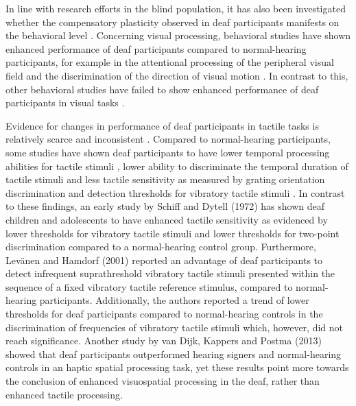 \documentclass[12pt]{article}
\begin{document}
\par In line with research efforts in the blind population, it has also been investigated whether the compensatory plasticity observed in deaf participants manifests on the behavioral level \parencite{heimler_response_2014,heimler_revisiting_2014}. Concerning visual processing, behavioral studies have shown enhanced performance of deaf participants compared to normal-hearing participants, for example in the attentional processing of the peripheral visual field \parencite{proksch_changes_2002} and the discrimination of the direction of visual motion \parencite{hauthal_visual_2013,shiell_enhancement_2014}. In contrast to this, other behavioral studies have failed to show enhanced performance of deaf participants in visual tasks \parencite{bavelier_deaf_2006,brozinsky_motion_2004,hauthal_visual_2013}. 
\par Evidence for changes in performance of deaf participants in tactile tasks is relatively scarce and inconsistent \parencite{heimler_multisensory_2017,papagno_deaf_2016}. Compared to normal-hearing participants, some studies have shown deaf participants to have lower temporal processing abilities for tactile stimuli \parencite{heming_sensory_2005}, lower ability to discriminate the temporal duration of tactile stimuli \parencite{bolognini_hearing_2011} and less tactile sensitivity as measured by grating orientation discrimination and detection thresholds for vibratory tactile stimuli \parencite{frenzel_genetic_2012, moshourab_congenital_2017}. In contrast to these findings, an early study by Schiff and Dytell (1972) has shown deaf children and adolescents to have enhanced tactile sensitivity as evidenced by lower thresholds for vibratory tactile stimuli and lower thresholds for two-point discrimination compared to a normal-hearing control group. Furthermore, Levänen and Hamdorf (2001) reported an advantage of deaf participants to detect infrequent suprathreshold vibratory tactile stimuli presented within the sequence of a fixed vibratory tactile reference stimulus, compared to normal-hearing participants. Additionally, the authors reported a trend of lower thresholds for deaf participants compared to normal-hearing controls in the discrimination of frequencies of vibratory tactile stimuli which, however, did not reach significance. Another study by van Dijk, Kappers and Postma (2013) showed that deaf participants outperformed hearing signers and normal-hearing controls in an haptic spatial processing task, yet these results point more towards the conclusion of enhanced visuospatial processing in the deaf, rather than enhanced tactile processing.
\end{document}
